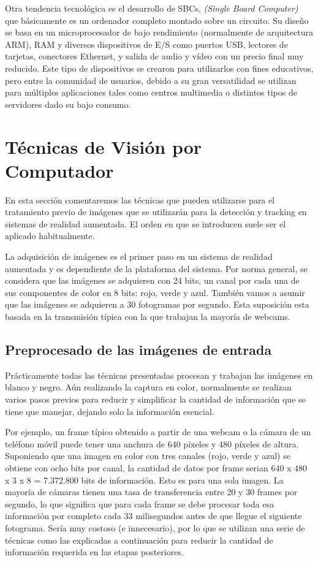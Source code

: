 Otra tendencia tecnológica es el desarrollo de SBCs, \textit{(Single Board Computer)} que básicamente es un ordenador completo montado sobre un circuito. Su diseño se basa en un microprocesador de bajo rendimiento (normalmente de arquitectura ARM), RAM y diversos dispositivos de E/S como puertos USB, lectores de tarjetas, conectores Ethernet, y salida de audio y vídeo con un precio final muy reducido. Este tipo de dispositivos se crearon para utilizarlos con fines educativos, pero entre la comunidad de usuarios, debido a su gran versatilidad se utilizan para múltiples aplicaciones tales como centros multimedia o distintos tipos de servidores dado su bajo consumo.  

\section{Técnicas de Visión por Computador}
En esta sección comentaremos las técnicas que pueden utilizarse para el tratamiento previo de imágenes que se utilizarán para la detección y tracking en sistemas de realidad aumentada. El orden en que se introducen suele ser el aplicado  habitualmente.

La adquisición de imágenes es el primer paso en un sistema de realidad aumentada y es dependiente de la plataforma del sistema. Por norma general, se considera que las imágenes se adquieren con 24 bits, un canal por cada una de sus componentes de color en 8 bits: rojo, verde y azul. También vamos a asumir que las imágenes se adquieren a 30 fotogramas por segundo. Esta suposición esta basada en la transmisión típica con la que trabajan la mayoría de webcams.

\subsection{Preprocesado de las imágenes de entrada}
Prácticamente todas las técnicas presentadas procesan y trabajan las imágenes en blanco y negro. Aún realizando la captura en color, normalmente se realizan varios pasos previos para reducir y simplificar la cantidad de información que se tiene que manejar, dejando solo la información esencial.

Por ejemplo, un frame típico obtenido a partir de una webcam o la cámara de un teléfono móvil puede tener una anchura de 640 píxeles y 480 píxeles de altura. Suponiendo que una imagen en color con tres canales (rojo, verde y azul) se obtiene con ocho bits por canal, la cantidad de datos por frame serian 640 x 480 x 3 x 8 = 7.372.800 bits de información. Esto es para una sola imagen. La mayoría de cámaras tienen una tasa de transferencia entre 20 y 30 frames por segundo, lo que significa que para cada frame se debe procesar toda esa información por completo cada 33 milisegundos antes de que llegue el siguiente fotograma. Sería muy costoso (e innecesario), por lo que se utilizan una serie de técnicas como las explicadas a continuación para reducir la cantidad de información requerida en las etapas posteriores.

